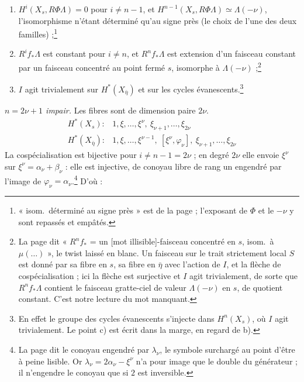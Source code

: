 \documentclass[11pt,a4paper]{article}
\begin{document}
\begin{enumerate}
\item[a)] $H^{i}(X_{s}, R\Phi\Lambda) = 0$ pour $i \neq n - 1$, et
$H^{n-1}(X_{s}, R\Phi\Lambda) \simeq \Lambda(-\nu)$, l'isomorphisme
n'étant déterminé qu'au signe près (le choix de l'une des deux
familles) ;\footnote{« isom.\ déterminé au signe près » est de la page ;
l'exposant de $\Phi$ et le $-\nu$ y sont repassés et empâtés.}
\item[b)] $R^{i}f_{*}\Lambda$ est constant pour $i \neq n$, et
$R^{n}f_{*}\Lambda$ est extension d'un faisceau constant par un faisceau
concentré au point fermé $s$, isomorphe à $\Lambda(-\nu)$ ;\footnote{La page
dit « $R^{n}f_{*}$ = un [mot illisible]-faisceau concentré en $s$, isom.\
à $\mu(\ldots)$ », le twist laissé en blanc. Un faisceau sur le trait
strictement local $S$ est donné par sa fibre en $s$, sa fibre en $\bar\eta$
avec l'action de $I$, et la flèche de cospécialisation ; ici la flèche est
surjective et $I$ agit trivialement, de sorte que $R^{n}f_{*}\Lambda$ contient
le faisceau gratte-ciel de valeur $\Lambda(-\nu)$ en $s$, de quotient
constant. C'est notre lecture du mot manquant.}
\item[c)] $I$ agit trivialement sur $H^{*}(X_{\bar\eta})$ et sur les cycles
évanescents.\footnote{En effet le groupe des cycles évanescents s'injecte
dans $H^{n}(X_{s})$, où $I$ agit trivialement. Le point c) est écrit dans la
marge, en regard de b).}
\end{enumerate}

\emph{$n = 2\nu + 1$ impair.} Les fibres sont de dimension paire $2\nu$.
\[
  \begin{array}{ll}
    H^{*}(X_{s}) : & 1, \xi, \ldots, \xi^{\nu}, \ \xi_{\nu+1}, \ldots, \xi_{2\nu} \\[4pt]
    H^{*}(X_{\bar\eta}) : & 1, \xi, \ldots, \xi^{\nu-1}, \ [\xi^{\nu}, \varphi_{\nu}], \
      \xi_{\nu+1}, \ldots, \xi_{2\nu}
  \end{array}
\]
La cospécialisation est bijective pour $i \neq n - 1 = 2\nu$ ; en degré
$2\nu$ elle envoie $\xi^{\nu}$ sur $\xi^{\nu} = \alpha_{\nu} + \beta_{\nu}$ :
elle est injective, de conoyau libre de rang un engendré par l'image de
$\varphi_{\nu} = \alpha_{\nu}$.\footnote{La page dit le conoyau engendré par
$\lambda_{\nu}$, le symbole surchargé au point d'être à peine lisible. Or
$\lambda_{\nu} = 2\alpha_{\nu} - \xi^{\nu}$ n'a pour image que le double du
générateur ; il n'engendre le conoyau que si $2$ est inversible.} D'où :
\end{document}
